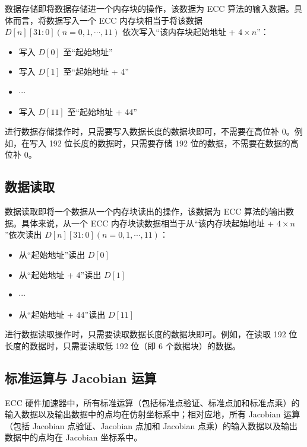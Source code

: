 \documentclass[main\_\_CN.tex]{subfiles}
\begin{document}
数据存储即将数据存储进一个内存块的操作，该数据为 ECC 算法的输入数据。具体而言，将数据写入一个 ECC 内存块相当于将该数据 $D[n][31:0] (n=0, 1, \cdots, 11)$ 依次写入“该内存块起始地址 + $4 \times n$”：

\begin{itemize}
    \item 写入 $D[0]$ 至“起始地址”
    \item 写入 $D[1]$ 至“起始地址 + 4”
    \item $\cdots$
    \item 写入 $D[11]$ 至“起始地址 + 44”
\end{itemize}

\begin{tiplisting}
进行数据存储操作时，只需要写入数据长度的数据块即可，不需要在高位补 0。例如，在写入 192 位长度的数据时，只需要存储 192 位的数据，不需要在数据的高位补 0。
\end{tiplisting}

\subsection{数据读取}

数据读取即将一个数据从一个内存块读出的操作，该数据为 ECC 算法的输出数据。具体来说，从一个 ECC 内存块读数据相当于从“该内存块起始地址 + $4 \times n$”依次读出 $D[n][31:0] (n=0, 1, \cdots, 11)$：
\begin{itemize}
    \item 从“起始地址”读出 $D[0]$
    \item 从“起始地址 + 4”读出 $D[1]$
    \item $\cdots$
    \item 从“起始地址 + 44”读出 $D[11]$
\end{itemize}

\begin{tiplisting}
进行数据读取操作时，只需要读取数据长度的数据块即可。例如，在读取 192 位长度的数据时，只需要读取低 192 位（即 6 个数据块）的数据。
\end{tiplisting}


\subsection{标准运算与 Jacobian 运算}

\chipname{} ECC 硬件加速器中，所有标准运算（包括标准点验证、标准点加和标准点乘）的输入数据以及输出数据中的点均在仿射坐标系中；相对应地，所有 Jacobian 运算（包括 Jacobian 点验证、Jacobian 点加和 Jacobian 点乘）的输入数据以及输出数据中的点均在 Jacobian 坐标系中。
\end{document}
